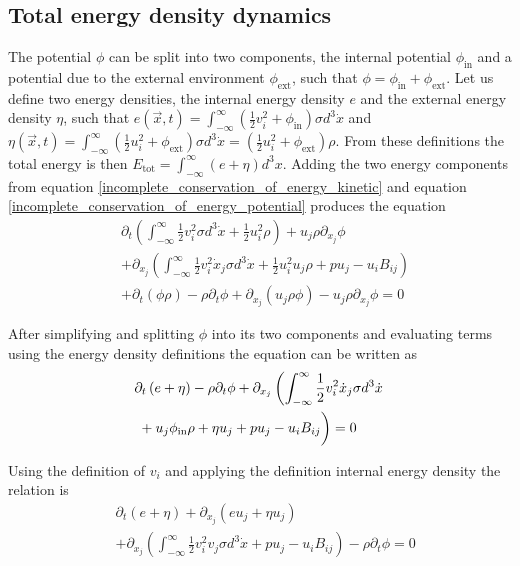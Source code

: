 \documentclass[%
 reprint,
 amsmath,amssymb,
 aps,
]{revtex4-1}
\newcommand{\intV}[1]{\int_{-\infty}^{\infty} #1 d^3x}
\newcommand{\intVdot}[1]{\int_{-\infty}^{\infty} #1 d^3\dot{x}}
\begin{document}
\subsection{Total energy density dynamics}
The potential $\phi$ can be split into two components, the internal potential $\phi_{\text{in}}$ and a potential due to the external environment $\phi_{\text{ext}}$, such that $\phi = \phi_{\text{in}} + \phi_{\text{ext}}$. Let us define two energy densities, the internal energy density $e$ and the external energy density $\eta$, such that $e(\vec{x}, t)=\intVdot{\left(\frac{1}{2}v_i^2 + \phi_{\text{in}}\right)\sigma}$ and $\eta(\vec{x}, t)=\intVdot{\left(\frac{1}{2}u_i^2 + \phi_{\text{ext}}\right)\sigma}=\left(\frac{1}{2}u_i^2 + \phi_{\text{ext}}\right)\rho$. From these definitions the total energy is then $E_{\text{tot}}=\intV{\left(e + \eta\right)}$. Adding the two energy components from equation \eqref{incomplete_conservation_of_energy_kinetic} and equation \eqref{incomplete_conservation_of_energy_potential} produces the equation
\[
\begin{split}
& \partial_t\left(\intVdot{\frac{1}{2}v_i^2\sigma} + \frac{1}{2}u_i^2\rho\right) + u_j\rho\partial_{x_j}\phi \\ & + \partial_{x_j}\left(\intVdot{\frac{1}{2}v_i^2\dot{x}_j\sigma} + \frac{1}{2}u_i^2 u_j\rho + p u_j - u_i B_{ij}\right) \\ & + \partial_t\left(\phi\rho\right) - \rho\partial_t\phi + \partial_{x_j}\left(u_j\rho\phi\right) - u_j\rho\partial_{x_j}\phi=0
\end{split}
\]

After simplifying and splitting $\phi$ into its two components and evaluating terms using the energy density definitions the equation can be written as
\[
\begin{split}
& \partial_t\left(e + \eta\right)  - \rho\partial_t\phi + \partial_{x_j}\left(\intVdot{\frac{1}{2}v_i^2\dot{x}_j\sigma} \right. \\ & \left. \vphantom{\intVdot{.}} + u_j\phi_{\text{in}}\rho + \eta u_j + p u_j - u_i B_{ij}\right)=0
\end{split}
\]

Using the definition of $v_i$ and applying the definition internal energy density the relation is
\[
\begin{split}
& \partial_t\left(e + \eta\right) + \partial_{x_j}\left(e u_j + \eta u_j\right) \\ & + \partial_{x_j}\left(\intVdot{\frac{1}{2}v_i^2 v_j\sigma} + p u_j - u_i B_{ij}\right) - \rho\partial_t\phi=0
\end{split}
\]
\end{document}
